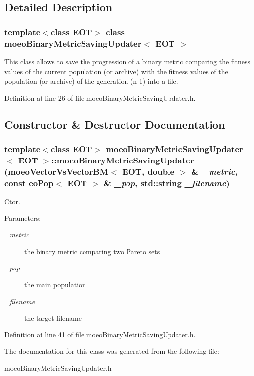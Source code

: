 \subsection{Detailed Description}
\subsubsection*{template$<$class EOT$>$ class moeo\-Binary\-Metric\-Saving\-Updater$<$ EOT $>$}

This class allows to save the progression of a binary metric comparing the fitness values of the current population (or archive) with the fitness values of the population (or archive) of the generation (n-1) into a file. 



Definition at line 26 of file moeo\-Binary\-Metric\-Saving\-Updater.h.

\subsection{Constructor \& Destructor Documentation}
\subsubsection{\setlength{\rightskip}{0pt plus 5cm}template$<$class EOT$>$ {\bf moeo\-Binary\-Metric\-Saving\-Updater}$<$ EOT $>$::{\bf moeo\-Binary\-Metric\-Saving\-Updater} ({\bf moeo\-Vector\-Vs\-Vector\-BM}$<$ EOT, double $>$ \& {\em \_\-metric}, const {\bf eo\-Pop}$<$ EOT $>$ \& {\em \_\-pop}, std::string {\em \_\-filename})\hspace{0.3cm}{\tt  [inline]}}\label{classmoeoBinaryMetricSavingUpdater_978c6e8a99459722220387f911c1f461}


Ctor. 

\begin{Desc}
\item[Parameters:]
\begin{description}
\item[{\em \_\-metric}]the binary metric comparing two Pareto sets \item[{\em \_\-pop}]the main population \item[{\em \_\-filename}]the target filename \end{description}
\end{Desc}


Definition at line 41 of file moeo\-Binary\-Metric\-Saving\-Updater.h.

The documentation for this class was generated from the following file:\begin{CompactItemize}
\item 
moeo\-Binary\-Metric\-Saving\-Updater.h\end{CompactItemize}
